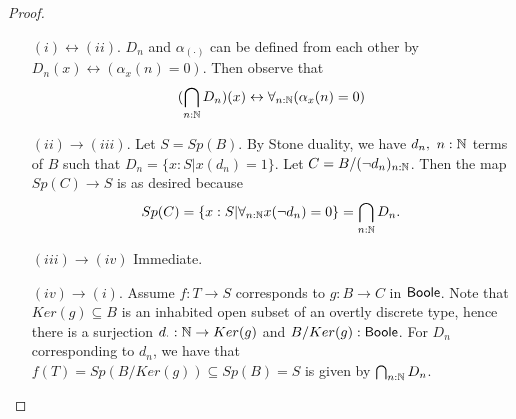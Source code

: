 \begin{proof}
\item 
  \begin{itemize}
  \item[$(i)\leftrightarrow (ii)$.] 
    $D_n$ and $\alpha_{(\cdot)}$ can be defined from each other by 
     $D_n(x) \leftrightarrow (\alpha_x(n) = 0)$. Then observe that
     \begin{equation}
      (\bigcap_{n:\mathbb{N}} D_n) (x) \leftrightarrow 
      \forall_{n:\mathbb N} (\alpha_x(n) = 0) 
     \end{equation}
   \item[$(ii) \to (iii)$.]
      Let $S=Sp(B)$. 
      By Stone duality, we have $d_n,~n:\mathbb{N}$ terms of $B$ such that $D_n = \{x:S| x(d_n) = 1\}$. 
      Let $C = B/(\neg d_n)_{n:\mathbb{N}}$.
      Then the map $Sp(C) \to S$ is as desired because
      $$Sp(C) = \{x:S| \forall_{n:\mathbb{N}} x(\neg d_n) =0\}  = \bigcap_{n:\mathbb{N}} D_n.$$
   \item[$(iii) \to (iv)$] Immediate.
   \item[$(iv) \to (i)$.] 
     Assume $f:T\to S$ corresponds to $g:B\to C$ in $\mathsf{Boole}$. 
     Note that $Ker(g)\subseteq B$ is an inhabited open subset of an overtly discrete type, 
     hence there is a surjection $d_\cdot:\mathbb{N}\to Ker(g)$ and $B/Ker(g) : \mathsf{Boole}$.
     For $D_n$ corresponding to $d_n$, we have that 
     $f(T) = Sp(B/Ker(g))\subseteq Sp(B) = S$ is given by $\bigcap_{n:\mathbb{N}} D_n$. 
%
%
%

\end{itemize}
\end{proof}
